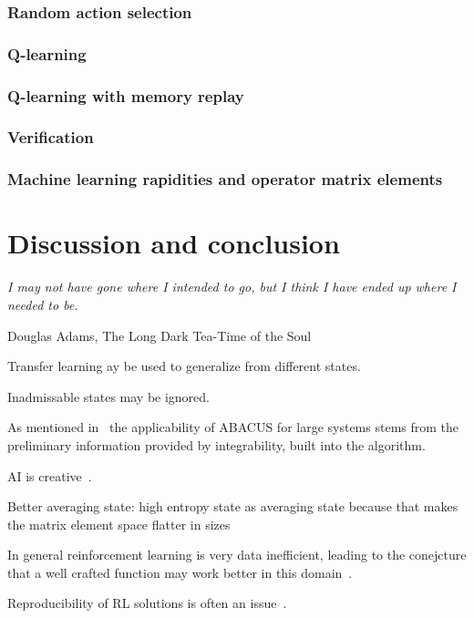 \documentclass[11pt, a4paper]{report} %
\begin{document}
\subsection{Random action selection}

\subsection{Q-learning}

\subsection{Q-learning with memory replay}

\subsection{Verification}


\subsection{Machine learning rapidities and operator matrix elements}

\chapter{Discussion and conclusion}\label{chap:conclusion}

\epigraph{\textit{I may not have gone where I intended to go, but I think I have ended up where I needed to be.}}{Douglas Adams, The Long Dark Tea-Time of the Soul}


Transfer learning ay be used to generalize from different states.

Inadmissable states may be ignored.

As mentioned in~\cite{Caux2009} the applicability of ABACUS for large systems stems from the preliminary information provided by integrability, built into the algorithm.

AI is creative~\cite{1803.03453}.

Better averaging state: high entropy state as averaging state because that makes the matrix element space flatter in sizes

In general reinforcement learning is very data inefficient, leading to the conejcture that a well crafted function may work better in this domain~\cite{1710.02298}.

Reproducibility of RL solutions is often an issue~\cite{1709.06560}.
\end{document}
